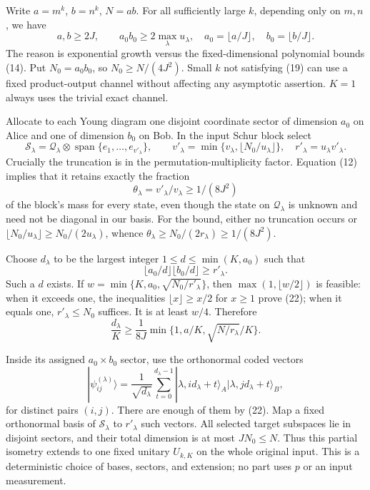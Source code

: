 \documentclass[11pt]{article}
\begin{document}
Write \(a=m^k\), \(b=n^k\), \(N=ab\). For all sufficiently large \(k\), depending only on \(m,n\), we have \[
 a,b\ge2J,\qquad a_0b_0\ge2\max_\lambda u_\lambda,
 \quad a_0=\lfloor a/J\rfloor,\quad b_0=\lfloor b/J\rfloor.
 \tag{19}
\] The reason is exponential growth versus the fixed-dimensional polynomial bounds (14). Put \(N_0=a_0b_0\), so \(N_0\ge N/(4J^2)\). Small \(k\) not satisfying (19) can use a fixed product-output channel without affecting any asymptotic assertion. \(K=1\) always uses the trivial exact channel.

Allocate to each Young diagram one disjoint coordinate sector of dimension \(a_0\) on Alice and one of dimension \(b_0\) on Bob. In the input Schur block select \[
 \mathcal S_\lambda=\mathcal Q_\lambda\otimes
      \operatorname{span}\{e_1,\ldots,e_{v'_\lambda}\},\qquad
 v'_\lambda=\min\{v_\lambda,\lfloor N_0/u_\lambda\rfloor\},
 \quad r'_\lambda=u_\lambda v'_\lambda.
 \tag{20}
\] Crucially the truncation is in the permutation-multiplicity factor. Equation (12) implies that it retains exactly the fraction \[
 \theta_\lambda=v'_\lambda/v_\lambda\ge1/(8J^2)
 \tag{21}
\] of the block's mass for every state, even though the state on \(\mathcal Q_\lambda\) is unknown and need not be diagonal in our basis. For the bound, either no truncation occurs or \(\lfloor N_0/u_\lambda\rfloor\ge N_0/(2u_\lambda)\), whence \(\theta_\lambda\ge N_0/(2r_\lambda)\ge1/(8J^2)\).

Choose \(d_\lambda\) to be the largest integer \(1\le d\le\min(K,a_0)\) such that \[
 \lfloor a_0/d\rfloor\lfloor b_0/d\rfloor\ge r'_\lambda.
 \tag{22}
\] Such a \(d\) exists. If \(w=\min\{K,a_0,\sqrt{N_0/r'_\lambda}\}\), then \(\max(1,\lfloor w/2\rfloor)\) is feasible: when it exceeds one, the inequalities \(\lfloor x\rfloor\ge x/2\) for \(x\ge1\) prove (22); when it equals one, \(r'_\lambda\le N_0\) suffices. It is at least \(w/4\). Therefore \[
 \frac{d_\lambda}{K}\ge\frac1{8J}
       \min\{1,a/K,\sqrt{N/r_\lambda}/K\}.
 \tag{23}
\]

Inside its assigned \(a_0\times b_0\) sector, use the orthonormal coded vectors \[
 |\psi_{ij}^{(\lambda)}\rangle=
 \frac1{\sqrt{d_\lambda}}\sum_{t=0}^{d_\lambda-1}
 |\lambda,id_\lambda+t\rangle_A
 |\lambda,jd_\lambda+t\rangle_B,
 \tag{24}
\] for distinct pairs \((i,j)\). There are enough of them by (22). Map a fixed orthonormal basis of \(\mathcal S_\lambda\) to \(r'_\lambda\) such vectors. All selected target subspaces lie in disjoint sectors, and their total dimension is at most \(JN_0\le N\). Thus this partial isometry extends to one fixed unitary \(U_{k,K}\) on the whole original input. This is a deterministic choice of bases, sectors, and extension; no part uses \(p\) or an input measurement.
\end{document}
